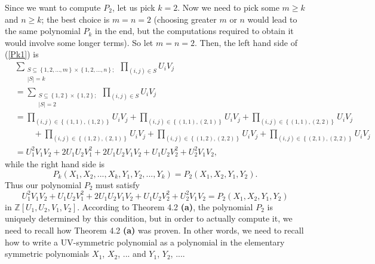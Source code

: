 \documentclass[numbers=enddot,12pt,final,onecolumn,notitlepage]{scrartcl}%
\begin{document}
Since we want to compute $P_{2}$, let us pick $k=2$. Now we need to pick some
$m\geq k$ and $n\geq k$; the best choice is $m=n=2$ (choosing greater $m$ or
$n$ would lead to the same polynomial $P_{k}$ in the end, but the computations
required to obtain it would involve some longer terms). So let $m=n=2$. Then,
the left hand side of (\ref{Pk1}) is%
\begin{align*}
&  \sum_{\substack{S\subseteq\left\{  1,2,...,m\right\}  \times\left\{
1,2,...,n\right\}  ;\\\left\vert S\right\vert =k}}\prod_{\left(  i,j\right)
\in S}U_{i}V_{j}\\
&  =\sum_{\substack{S\subseteq\left\{  1,2\right\}  \times\left\{
1,2\right\}  ;\\\left\vert S\right\vert =2}}\prod_{\left(  i,j\right)  \in
S}U_{i}V_{j}\\
&  =\prod_{\left(  i,j\right)  \in\left\{  \left(  1,1\right)  ,\left(
1,2\right)  \right\}  }U_{i}V_{j}+\prod_{\left(  i,j\right)  \in\left\{
\left(  1,1\right)  ,\left(  2,1\right)  \right\}  }U_{i}V_{j}+\prod_{\left(
i,j\right)  \in\left\{  \left(  1,1\right)  ,\left(  2,2\right)  \right\}
}U_{i}V_{j}\\
&  \ \ \ \ \ \ \ \ \ \ +\prod_{\left(  i,j\right)  \in\left\{  \left(
1,2\right)  ,\left(  2,1\right)  \right\}  }U_{i}V_{j}+\prod_{\left(
i,j\right)  \in\left\{  \left(  1,2\right)  ,\left(  2,2\right)  \right\}
}U_{i}V_{j}+\prod_{\left(  i,j\right)  \in\left\{  \left(  2,1\right)
,\left(  2,2\right)  \right\}  }U_{i}V_{j}\\
&  =U_{1}^{2}V_{1}V_{2}+2U_{1}U_{2}V_{1}^{2}+2U_{1}U_{2}V_{1}V_{2}+U_{1}%
U_{2}V_{2}^{2}+U_{2}^{2}V_{1}V_{2},
\end{align*}
while the right hand side is%
\[
P_{k}\left(  X_{1},X_{2},...,X_{k},Y_{1},Y_{2},...,Y_{k}\right)  =P_{2}\left(
X_{1},X_{2},Y_{1},Y_{2}\right)  .
\]
Thus our polynomial $P_{2}$ must satisfy
\[
U_{1}^{2}V_{1}V_{2}+U_{1}U_{2}V_{1}^{2}+2U_{1}U_{2}V_{1}V_{2}+U_{1}U_{2}%
V_{2}^{2}+U_{2}^{2}V_{1}V_{2}=P_{2}\left(  X_{1},X_{2},Y_{1},Y_{2}\right)
\]
in $\mathbb{Z}\left[  U_{1},U_{2},V_{1},V_{2}\right]  $. According to Theorem
4.2 \textbf{(a)}, the polynomial $P_{2}$ is uniquely determined by this
condition, but in order to actually compute it, we need to recall how Theorem
4.2 \textbf{(a)} was proven. In other words, we need to recall how to write a
UV-symmetric polynomial as a polynomial in the elementary symmetric
polynomials $X_{1}$, $X_{2}$, $...$ and $Y_{1}$, $Y_{2}$, $...$.
\end{document}
